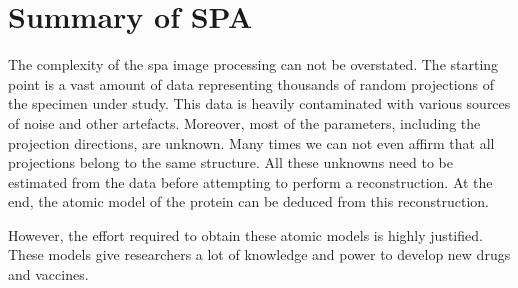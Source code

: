 \documentclass[../main.tex]{subfiles}
\begin{document}
\section{Summary of SPA}
The complexity of the \gls{spa} image processing can not be overstated. The starting point is a vast amount of data representing thousands of random projections of the specimen under study. This data is heavily contaminated with various sources of noise and other artefacts. Moreover, most of the parameters, including the projection directions, are unknown. Many times we can not even affirm that all projections belong to the same structure. All these unknowns need to be estimated from the data before attempting to perform a reconstruction. At the end, the atomic model of the protein can be deduced from this reconstruction. 

However, the effort required to obtain these atomic models is highly justified. These models give researchers a lot of knowledge and power to develop new drugs and vaccines.
\end{document}
